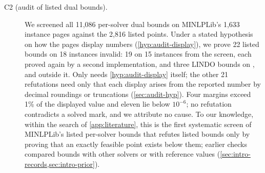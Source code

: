 \begin{description}
\item[C2 (audit of listed dual bounds).]
We screened all 11,086 per-solver dual bounds on MINLPLib's 1,633 instance pages against the 2,816 listed points.
Under a stated hypothesis on how the pages display numbers (\cref{hyp:audit-display}), we prove 22 listed bounds on 18 instances invalid: 19 on 15 instances from the screen, each proved again by a second implementation, and three LINDO bounds on ,  and  outside it.
Only  needs \cref{hyp:audit-display} itself; the other 21 refutations need only that each display arises from the reported number by decimal roundings or truncations (\cref{sec:audit-hyp}).
Four margins exceed 1\% of the displayed value and eleven lie below $10^{-6}$; no refutation contradicts a solved mark, and we attribute no cause.
To our knowledge, within the search of \cref{app:literature}, this is the first systematic screen of MINLPLib's listed per-solver bounds that refutes listed bounds only by proving that an exactly feasible point exists below them; earlier checks compared bounds with other solvers or with reference values (\cref{sec:intro-records,sec:intro-prior}).


\end{description}

